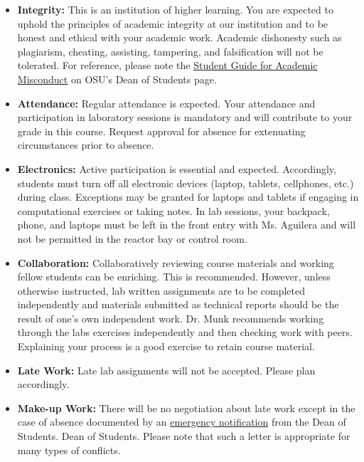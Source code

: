 \documentclass[11pt, a4paper]{article}
\begin{document}
\begin{itemize}
\item[] \textbf{Integrity:} This is an institution of higher
learning. You are expected to uphold the principles of academic 
integrity at our institution and to be honest and ethical with your academic work. 
Academic dishonesty such as plagiarism, cheating, assisting, tampering, and falsification will not be 
tolerated. 
For reference, please note the \href{https://studentlife.oregonstate.edu/studentconduct/academic-misconduct-students}{Student Guide for Academic Misconduct} 
on OSU's Dean of Students page. 

\item[] \textbf{Attendance:} Regular attendance is expected. Your attendance and participation in laboratory sessions is mandatory and will contribute to your grade in this course. Request approval for absence for extenuating circumstances prior to absence.

\item[] \textbf{Electronics:} Active participation is essential and expected.
        Accordingly, students must turn off all electronic devices (laptop,
        tablets, cellphones, etc.) during class. Exceptions may be granted for
        laptops and tablets if engaging in computational exercises or taking notes. In lab sessions, your backpack, phone, and laptops must be left in the front entry with Ms. Aguilera and 
will not be permitted in the reactor bay or control room. 
\item[] \textbf{Collaboration:} Collaboratively reviewing course materials and
  working fellow students can be enriching.  This is
  recommended.  However, unless otherwise instructed, lab written assignments are
  to be completed independently and materials submitted as technical reports should be
  the result of one's own independent work. Dr. Munk recommends working through
  the labs exercises independently and then checking work with peers. Explaining your
  process is a good exercise to retain course material.
\item[] \textbf{Late Work:} Late lab assignments will not be accepted. Please plan accordingly. 

\item[] \textbf{Make-up Work:} There will be no negotiation about late work
        except in the case of absence documented by an 
\href{https://studentlife.oregonstate.edu/emergency-notifications}{emergency notification} from the Dean of Students.
        Dean of Students. Please note that such a letter is appropriate for many
        types of conflicts. 


\end{itemize}
\end{document}
